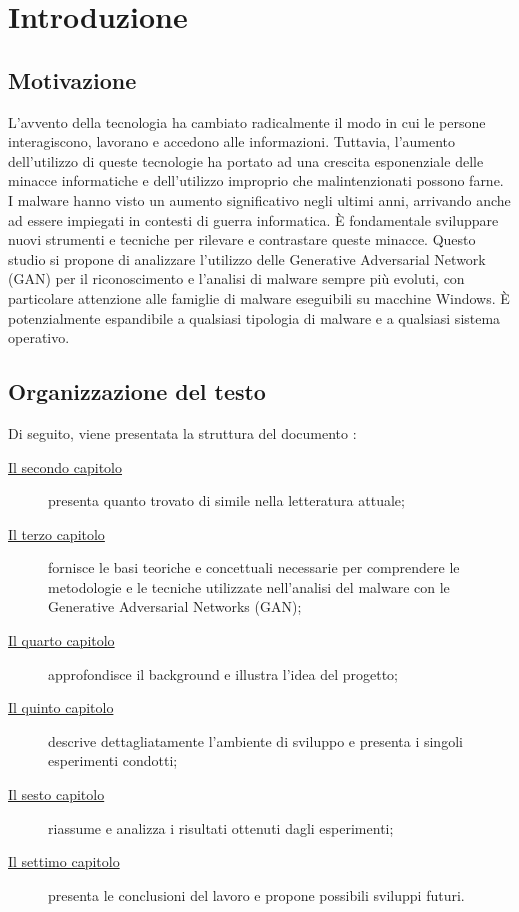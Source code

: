 \chapter{Introduzione}
\label{cap:introduzione}

\section{Motivazione}
L'avvento della tecnologia ha cambiato radicalmente il modo in cui le persone interagiscono, lavorano e accedono alle informazioni. 
Tuttavia, l'aumento dell'utilizzo di queste tecnologie ha portato ad una crescita esponenziale delle minacce informatiche e dell'utilizzo improprio che malintenzionati possono farne. I malware hanno visto un aumento significativo negli ultimi anni, arrivando anche ad essere impiegati in contesti di guerra informatica. 
È fondamentale sviluppare nuovi strumenti e tecniche per rilevare e contrastare queste minacce. Questo studio si propone di analizzare l'utilizzo delle Generative Adversarial Network (GAN) per il riconoscimento e l'analisi di malware sempre più evoluti, con particolare attenzione alle famiglie di malware eseguibili su macchine Windows. È potenzialmente espandibile a qualsiasi tipologia di malware e a qualsiasi sistema operativo.


\section{Organizzazione del testo}
\indent Di seguito, viene presentata la struttura del documento :
\begin{description}
    \item[{\hyperref[cap:RelatedWorks]{Il secondo capitolo}}] presenta quanto trovato di simile nella letteratura attuale;

    \item[{\hyperref[cap:background]{Il terzo capitolo}}] fornisce le basi teoriche e concettuali necessarie per comprendere le metodologie e le tecniche utilizzate nell'analisi del malware con le Generative Adversarial Networks (GAN);

    \item[{\hyperref[cap:descrizione]{Il quarto capitolo}}] approfondisce il background e illustra l'idea del progetto;
    
    \item[{\hyperref[cap:processi-metodologie]{Il quinto capitolo}}] descrive dettagliatamente l'ambiente di sviluppo e presenta i singoli esperimenti condotti;

    \item[{\hyperref[cap:risultati]{Il sesto capitolo}}] riassume e analizza i risultati ottenuti dagli esperimenti;
    
    \item[{\hyperref[cap:conclusioni]{Il settimo capitolo}}] presenta le conclusioni del lavoro e propone possibili sviluppi futuri.
\end{description}
